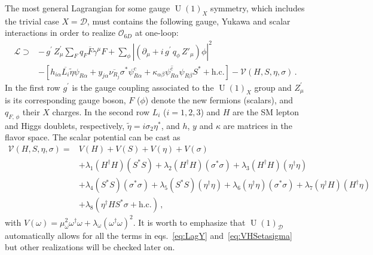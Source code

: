 \documentclass[12pt]{article}
\begin{document}
The most general Lagrangian for some gauge $\operatorname{U}(1)_X$ symmetry, which includes the trivial case $X=\mathcal{D}$, must contains the following gauge, Yukawa and scalar interactions in
order to realize $\mathcal{O}_{6D}$ at one-loop:
%
\begin{align}
\label{eq:LagY}
    \mathcal{L} \supset& -\,g^{\prime}\,Z_\mu^\prime\sum_{F}q_{F}\overline{F} \gamma^\mu F+\sum_{\phi}\left|\left( \partial_\mu +i\,g^{\prime}\,q_\phi\,Z'_\mu \right) \phi\right|^2\nonumber\\
    &-[ 
    h_{i\alpha} \overline{L_{i}} \tilde{\eta} \psi_{R\alpha} +  y_{j\alpha} \overline{\nu_{R_{j}}} \sigma^* \psi^c_{R\alpha} + \kappa_{\alpha\beta} \overline{\psi^{c}_{R\alpha}} \psi_{R\beta} S^* + \text{h.c.}] - \mathcal{V}(H, S, \eta, \sigma)\,.
\end{align}
%
In the first row $g^{\prime}$ is the gauge coupling associated to the $\operatorname{U}(1)_X$ group and $Z_\mu^\prime$ is its corresponding gauge boson, $F$ ($\phi$) denote the new fermions (scalars), and $q_{F,\,\phi}$ their $X$ charges. In the second row
$L_{i}$ ($i=1,2,3$) and $H$ are the SM lepton and Higgs doublets, respectively,  $\widetilde{\eta} = i \sigma_2 \eta^*$, and $h$, $y$ and $\kappa$ are matrices in the flavor space. 
The scalar potential can be cast as
%
\begin{align}
  \label{eq:VHSetasigma}
    \mathcal{V}(H, S, \eta, \sigma) = & V(H) + V(S) + V(\eta) + V(\sigma) \nonumber\\
    &+  \lambda_{1} (H^{\dagger} H ) (S^{*} S) + \lambda_{2} (H^{\dagger} H ) (\sigma^{*} \sigma ) + \lambda_{3} (H^{\dagger} H ) (\eta^{\dagger} \eta )\nonumber\\
    &+ \lambda_{4} (S^{*} S) (\sigma^{*} \sigma ) + \lambda_{5} (S^{*} S) (\eta^{\dagger} \eta ) + \lambda_{6} (\eta^{\dagger} \eta ) (\sigma^{*} \sigma ) + \lambda_{7} (\eta^{\dagger} H ) (H^{\dagger} \eta ) \nonumber\\
    &+ \lambda_{8} (\eta^{\dagger} H S^{*} \sigma + \text{h.c.})\,,
\end{align}
%
%
%
with $V(\omega) = \mu^{2}_{\omega} \omega^{\dagger} \omega + \lambda_{\omega} (\omega^{\dagger} \omega)^{2}$. It is worth to emphasize that $\operatorname{U}(1)_{\mathcal{D}}$ automatically allows for all the terms in eqs.~\eqref{eq:LagY} and~\eqref{eq:VHSetasigma} but other realizations will be checked later on.
\end{document}
